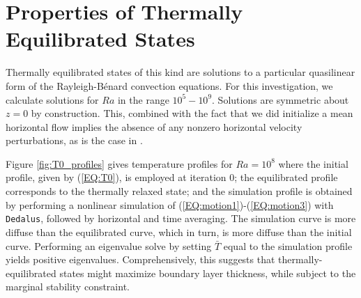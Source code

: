 \documentclass[reprint,amsmath,amssymb,aps]{revtex4-1}
\begin{document}
\section{Properties of Thermally Equilibrated States}\label{sec:properties}
Thermally equilibrated states of this kind are solutions to a particular quasilinear form of the Rayleigh-B\'enard convection equations. 
For this investigation, we calculate solutions for $Ra$ in the range $10^5 - 10^9$. 
Solutions are symmetric about $z = 0$ by construction. 
This, combined with the fact that we did initialize a mean horizontal flow implies the absence of any nonzero horizontal velocity perturbations, as is the case in \cite{Waleffe}. 

Figure \ref{fig:T0_profiles} gives temperature profiles for $Ra = 10^8$ where the initial profile, given by (\ref{EQ:T0}), is employed at iteration 0; the equilibrated profile corresponds to the thermally relaxed state; and the simulation profile is obtained by performing a nonlinear simulation of (\ref{EQ:motion1})-(\ref{EQ:motion3}) with \texttt{Dedalus}, followed by horizontal and time averaging. 
The simulation curve is more diffuse than the equilibrated curve, which in turn, is more diffuse than the initial curve. 
Performing an eigenvalue solve by setting $\bar{T}$ equal to the simulation profile yields positive eigenvalues. 
Comprehensively, this suggests that thermally-equilibrated states might maximize boundary layer thickness, while subject to the marginal stability constraint.
\end{document}
